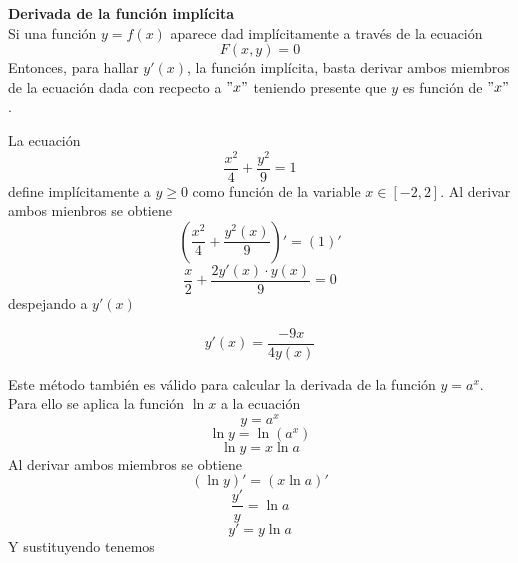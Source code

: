\documentclass[10pt,twoside]{SelfArx} %
\begin{document}
\textbf{Derivada de la función implícita}\\
Si una función $ y=f(x) $ aparece dad impl\'icitamente  a trav\'es de la ecuación 
\[ F(x,y)=0 \]
Entonces, para hallar $ y'(x) $, la funci\'on implícita, basta derivar ambos miembros de la ecuación dada con recpecto a $ "x" $ teniendo presente que  $ y $ es función de $ "x" $.
\begin{ejemplo}
	La ecuación 
	\[ \dfrac{x^{2}}{4}+\dfrac{y^{2}}{9}=1 \]
	define implícitamente a $ y\geq0 $ como función de la variable $ x\in [-2,2] $. Al derivar ambos mienbros se obtiene
	\begin{equation}
	(\dfrac{x^{2}}{4}+\dfrac{y^{2}(x)}{9})'=(1)'
	\end{equation}
	\begin{equation}
	\dfrac{x}{2}+\dfrac{2y'(x)\cdot y(x)}{9}=0
	\end{equation}
	despejando a $ y'(x) $

		\begin{equation}
		y'(x)=\dfrac{-9x}{4y(x)}
		\end{equation}
		
\end{ejemplo}
Este método también es válido para calcular la derivada de la función $ y=a^{x} $.\\
Para ello se aplica la función $ \ln x $ a la ecuación 
\begin{equation}
y=a^{x}
\end{equation}
\begin{equation}
\ln y=\ln(a^{x})
\end{equation}
\begin{equation}
\ln y=x\ln a
\end{equation}
Al derivar ambos miembros  se obtiene 
\begin{equation}
(\ln y)'=(x\ln a)'
\end{equation}
\begin{equation}
\dfrac{y'}{y}=\ln a
\end{equation}
\begin{equation}
y'=y\ln a
\end{equation}
Y sustituyendo tenemos\\
\end{document}
